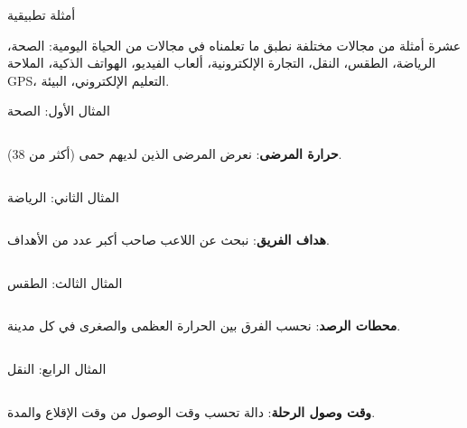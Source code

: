 \documentclass[aspectratio=169, 11pt, t, xcolor={table}]{beamer}
\begin{document}
\begin{frame}{أمثلة تطبيقية}
    \begin{tbox}{\faLaptopCode\quad عشرة أمثلة من مجالات مختلفة}
        نطبق ما تعلمناه في مجالات من الحياة اليومية:
        الصحة، الرياضة، الطقس، النقل، التجارة الإلكترونية، ألعاب الفيديو، الهواتف الذكية، الملاحة \textenglish{GPS}، التعليم الإلكتروني، البيئة.
    \end{tbox}
\end{frame}

\begin{frame}[t]{المثال الأول: الصحة}
    \begin{columns}[T]
        {\small \textbf{حرارة المرضى}: نعرض المرضى الذين لديهم حمى (أكثر من 38).\par}
        \vspace{0.3cm}
    \end{columns}
\end{frame}

\begin{frame}[t]{المثال الثاني: الرياضة}
    \begin{columns}[T]
        {\small \textbf{هداف الفريق}: نبحث عن اللاعب صاحب أكبر عدد من الأهداف.\par}
        \vspace{0.3cm}
    \end{columns}
\end{frame}

\begin{frame}[t]{المثال الثالث: الطقس}
    \begin{columns}[T]
        {\small \textbf{محطات الرصد}: نحسب الفرق بين الحرارة العظمى والصغرى في كل مدينة.\par}
        \vspace{0.3cm}
    \end{columns}
\end{frame}

\begin{frame}[t]{المثال الرابع: النقل}
    \begin{columns}[T]
        {\small \textbf{وقت وصول الرحلة}: دالة تحسب وقت الوصول من وقت الإقلاع والمدة.\par}
        \vspace{0.3cm}
    \end{columns}
\end{frame}
\end{document}
